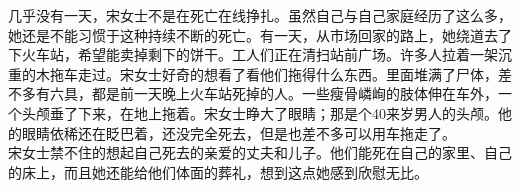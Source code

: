 \begin{multicols}{\theparacolNo}
几乎没有一天，宋女士不是在死亡在线挣扎。虽然自己与自己家庭经历了这么多，她还是不能习惯于这种持续不断的死亡。有一天，从市场回家的路上，她绕道去了下火车站，希望能卖掉剩下的饼干。工人们正在清扫站前广场。许多人拉着一架沉重的木拖车走过。宋女士好奇的想看了看他们拖得什么东西。里面堆满了尸体，差不多有六具，都是前一天晚上火车站死掉的人。一些瘦骨嶙峋的肢体伸在车外，一个头颅垂了下来，在地上拖着。宋女士睁大了眼睛；那是个40来岁男人的头颅。他的眼睛依稀还在眨巴着，还没完全死去，但是也差不多可以用车拖走了。\\

宋女士禁不住的想起自己死去的亲爱的丈夫和儿子。他们能死在自己的家里、自己的床上，而且她还能给他们体面的葬礼，想到这点她感到欣慰无比。\\
\ifnum{}
	\end{multicols}
\fi